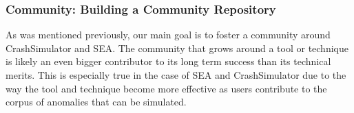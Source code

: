 



%



\subsubsection{Community: Building a Community Repository}

As was mentioned previously, our main goal is to foster a community around
CrashSimulator and SEA.  The community that grows around a tool or
technique is likely an even bigger contributor to its long term success
than its technical merits.  This is especially true in the case of SEA and
CrashSimulator due to the way the tool and technique become more effective
as users contribute to the corpus of anomalies that can be simulated.  


